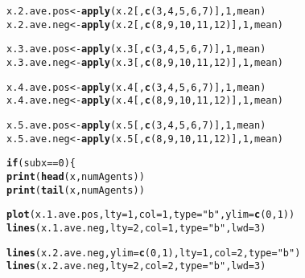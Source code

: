 \documentclass{article}\usepackage[]{graphicx}\usepackage[]{color}
\makeatletter
\newcommand{\hlnum}[1]{\textcolor[rgb]{0.686,0.059,0.569}{#1}}%
\newcommand{\hlstr}[1]{\textcolor[rgb]{0.192,0.494,0.8}{#1}}%
\newcommand{\hlopt}[1]{\textcolor[rgb]{0,0,0}{#1}}%
\newcommand{\hlstd}[1]{\textcolor[rgb]{0.345,0.345,0.345}{#1}}%
\newcommand{\hlkwa}[1]{\textcolor[rgb]{0.161,0.373,0.58}{\textbf{#1}}}%
\newcommand{\hlkwb}[1]{\textcolor[rgb]{0.69,0.353,0.396}{#1}}%
\newcommand{\hlkwc}[1]{\textcolor[rgb]{0.333,0.667,0.333}{#1}}%
\newcommand{\hlkwd}[1]{\textcolor[rgb]{0.737,0.353,0.396}{\textbf{#1}}}%
\newenvironment{kframe}{%
 \def\at@end@of@kframe{}%
 \ifinner\ifhmode%
  \def\at@end@of@kframe{\end{minipage}}%
  \begin{minipage}{\columnwidth}%
 \fi\fi%
 \def\FrameCommand##1{\hskip\@totalleftmargin \hskip-\fboxsep
 \colorbox{shadecolor}{##1}\hskip-\fboxsep
     \hskip-\linewidth \hskip-\@totalleftmargin \hskip\columnwidth}%
 \MakeFramed {\advance\hsize-\width
   \@totalleftmargin\z@ \linewidth\hsize
   \@setminipage}}%
 {\par\unskip\endMakeFramed%
 \at@end@of@kframe}
\newenvironment{knitrout}{}{} %
\makeatother
\begin{document}
\begin{knitrout}
\begin{kframe}
\begin{alltt}
    \hlstd{x.2.ave.pos} \hlkwb{<-} \hlkwd{apply}\hlstd{(x.2[,} \hlkwd{c}\hlstd{(}\hlnum{3}\hlstd{,} \hlnum{4}\hlstd{,} \hlnum{5}\hlstd{,} \hlnum{6}\hlstd{,} \hlnum{7}\hlstd{)],} \hlnum{1}\hlstd{, mean)}
    \hlstd{x.2.ave.neg} \hlkwb{<-} \hlkwd{apply}\hlstd{(x.2[,} \hlkwd{c}\hlstd{(}\hlnum{8}\hlstd{,} \hlnum{9}\hlstd{,} \hlnum{10}\hlstd{,} \hlnum{11}\hlstd{,} \hlnum{12}\hlstd{)],} \hlnum{1}\hlstd{, mean)}

    \hlstd{x.3.ave.pos} \hlkwb{<-} \hlkwd{apply}\hlstd{(x.3[,} \hlkwd{c}\hlstd{(}\hlnum{3}\hlstd{,} \hlnum{4}\hlstd{,} \hlnum{5}\hlstd{,} \hlnum{6}\hlstd{,} \hlnum{7}\hlstd{)],} \hlnum{1}\hlstd{, mean)}
    \hlstd{x.3.ave.neg} \hlkwb{<-} \hlkwd{apply}\hlstd{(x.3[,} \hlkwd{c}\hlstd{(}\hlnum{8}\hlstd{,} \hlnum{9}\hlstd{,} \hlnum{10}\hlstd{,} \hlnum{11}\hlstd{,} \hlnum{12}\hlstd{)],} \hlnum{1}\hlstd{, mean)}

    \hlstd{x.4.ave.pos} \hlkwb{<-} \hlkwd{apply}\hlstd{(x.4[,} \hlkwd{c}\hlstd{(}\hlnum{3}\hlstd{,} \hlnum{4}\hlstd{,} \hlnum{5}\hlstd{,} \hlnum{6}\hlstd{,} \hlnum{7}\hlstd{)],} \hlnum{1}\hlstd{, mean)}
    \hlstd{x.4.ave.neg} \hlkwb{<-} \hlkwd{apply}\hlstd{(x.4[,} \hlkwd{c}\hlstd{(}\hlnum{8}\hlstd{,} \hlnum{9}\hlstd{,} \hlnum{10}\hlstd{,} \hlnum{11}\hlstd{,} \hlnum{12}\hlstd{)],} \hlnum{1}\hlstd{, mean)}

    \hlstd{x.5.ave.pos} \hlkwb{<-} \hlkwd{apply}\hlstd{(x.5[,} \hlkwd{c}\hlstd{(}\hlnum{3}\hlstd{,} \hlnum{4}\hlstd{,} \hlnum{5}\hlstd{,} \hlnum{6}\hlstd{,} \hlnum{7}\hlstd{)],} \hlnum{1}\hlstd{, mean)}
    \hlstd{x.5.ave.neg} \hlkwb{<-} \hlkwd{apply}\hlstd{(x.5[,} \hlkwd{c}\hlstd{(}\hlnum{8}\hlstd{,} \hlnum{9}\hlstd{,} \hlnum{10}\hlstd{,} \hlnum{11}\hlstd{,} \hlnum{12}\hlstd{)],} \hlnum{1}\hlstd{, mean)}

    \hlkwa{if} \hlstd{(subx} \hlopt{==} \hlnum{0}\hlstd{) \{}
        \hlkwd{print}\hlstd{(}\hlkwd{head}\hlstd{(x, numAgents))}
        \hlkwd{print}\hlstd{(}\hlkwd{tail}\hlstd{(x, numAgents))}

        \hlkwd{plot}\hlstd{(x.1.ave.pos,} \hlkwc{lty} \hlstd{=} \hlnum{1}\hlstd{,} \hlkwc{col} \hlstd{=} \hlnum{1}\hlstd{,} \hlkwc{type} \hlstd{=} \hlstr{"b"}\hlstd{,} \hlkwc{ylim} \hlstd{=} \hlkwd{c}\hlstd{(}\hlnum{0}\hlstd{,} \hlnum{1}\hlstd{))}
        \hlkwd{lines}\hlstd{(x.1.ave.neg,} \hlkwc{lty} \hlstd{=} \hlnum{2}\hlstd{,} \hlkwc{col} \hlstd{=} \hlnum{1}\hlstd{,} \hlkwc{type} \hlstd{=} \hlstr{"b"}\hlstd{,} \hlkwc{lwd} \hlstd{=} \hlnum{3}\hlstd{)}

        \hlkwd{lines}\hlstd{(x.2.ave.neg,} \hlkwc{ylim} \hlstd{=} \hlkwd{c}\hlstd{(}\hlnum{0}\hlstd{,} \hlnum{1}\hlstd{),} \hlkwc{lty} \hlstd{=} \hlnum{1}\hlstd{,} \hlkwc{col} \hlstd{=} \hlnum{2}\hlstd{,} \hlkwc{type} \hlstd{=} \hlstr{"b"}\hlstd{)}
        \hlkwd{lines}\hlstd{(x.2.ave.neg,} \hlkwc{lty} \hlstd{=} \hlnum{2}\hlstd{,} \hlkwc{col} \hlstd{=} \hlnum{2}\hlstd{,} \hlkwc{type} \hlstd{=} \hlstr{"b"}\hlstd{,} \hlkwc{lwd} \hlstd{=} \hlnum{3}\hlstd{)}


\end{alltt}
\end{kframe}
\end{knitrout}
\end{document}
